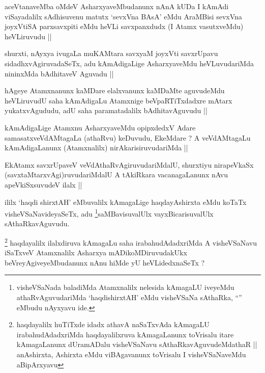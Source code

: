 \begin{artha}
aceVtanaveMba oMdeV AsharxyaveMbudanunx nAnA kUDa I kAmAdi
viSayadalilx sAdhisuvenu matutx `sevxVna BAsA' eMdu AraMBisi sevxVna
joyxVtiSA parxsavxpiti eMdu heVLi savxpanxdudx (I Atamx vasutxveMdu)
heVLiruvudu ||
\end{artha}

\begin{artha}
shurxti, nAyxya ivugaLa muKAMtara savxyaM joyxVti savxrUpavu
sidadhxvAgiruvadaSeTx, adu kAmAdigaLige AsharxyaveMdu heVLuvudariMda
nininxMda bAdhitaveV Aguvadu ||
\end{artha}

\begin{artha}
hAgeye Atamxnanunx kaMDare elalxvanunx kaMDaMte aguvudeMdu heVLiruvudU
saha kAmAdigaLu Atamxnige beVpaRTiTxdadxre mAtarx yukatxvAgududu, adU
saha paramatadalilx bAdhitavAguvudu ||
\end{artha}

\begin{artha}
kAmAdigaLige Atamxnu AsharxyaveMdu opipxdedxV Adare
samasatxveVdAMtagaLa (athaRvu) keDuvudu, EkeMdare ? A veVdAMtagaLu
kAmAdigaLanunx (Atamxnalilx) nirAkarisiruvudariMda  ||
\end{artha}

\begin{artha}
EkAtamx savxrUpaveV veVdAthaRvAgiruvudariMdalU, shurxtiyu nirapeVkaSx
(savxtaMtarxvAgi)ruvudariMdalU A tAkiRkara vacanagaLanunx nAvu
apeVkiSxsuvudeV ilalx ||
\end{artha}


\begin{artha}
ililx `haqdi shirxtAH' eMbuvalilx kAmagaLige haqdayAshirxta eMdu
koTaTx visheVSaNavideyaSeTx, adu \footnote{visheVSaNada baladiMda
  Atamxnalilx nelesida kAmagaLU iveyeMdu athaRvAguvudariMda
  `haqdishirxtAH' eMdu visheVSaNa sAthaRka, ``\stext'' eMbudu nAyxyavu ide.}saMBavisuvalUlx
vayxBicarisuvalUlx sAthaRkavAguvudu.
\end{artha}

\begin{artha}
\footnote{haqdayalilx huTiTxde idadx athavA naSaTxvAda kAmagaLU
  irabahudAdadxriMda haqdayalilxruva kAmagaLanunx toVrisalu itare
  kAmagaLanunx dUramADalu visheVSaNavu sAthaRkavAguvudeMdathaR ||
  anAshirxta, Ashirxta eMdu viBAgavanunx toVrisalu I visheVSaNaveMdu aBipArxyavu}
haqdayalilx ilalxdiruva kAmagaLu saha irabahudAdadxriMda A
visheVSaNavu iSaTxveV Atamxnalilx Asharxya mADikoMDiruvudakUkx
beVreyAgiveyeMbudanunx nAnu hiMde yU heVLidedxnaSeTx ?
\end{artha}

